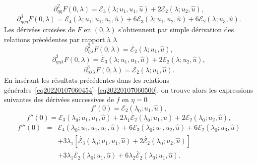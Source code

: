 \documentclass{article}
\newcommand{\nocomma}{}
\newcommand{\nosymbol}{}
\begin{document}
\begin{equation}
  \partial_{\eta \nocomma \eta}^2 F (0, \lambda) =\mathcal{E}_3 (\lambda ;
  u_1, u_1, \hat{u}) + 2\mathcal{E}_2 (\lambda ; u_2, \hat{u}),
\end{equation}
\begin{equation}
  \partial_{\eta \nocomma \eta \nocomma \eta}^3 F (0, \lambda) =\mathcal{E}_4
  (\lambda ; u_1, u_1, u_1, \hat{u}) + 6\mathcal{E}_3 (\lambda ; u_1, u_2,
  \hat{u}) + 6\mathcal{E}_2 (\lambda ; u_3, \hat{u}) .
\end{equation}
Les d{\'e}riv{\'e}es crois{\'e}es de $F$ en $(0, \lambda)$ s'obtiennent par
simple d{\'e}rivation des relations pr{\'e}c{\'e}dentes par rapport {\`a}
$\lambda$
\begin{equation}
  \partial_{\eta \nocomma \lambda}^2 F (0, \lambda) = \dot{\mathcal{E}_2}
  (\lambda ; u_1, \hat{u}),
\end{equation}
\begin{equation}
  \partial_{\eta \nocomma \eta \nocomma \lambda}^3 F (0, \lambda) =
  \dot{\mathcal{E}_3} (\lambda ; u_1, u_1, \hat{u}) + 2 \dot{\mathcal{E}_2}
  (\lambda ; u_2, \hat{u}),
\end{equation}
\begin{equation}
  \partial_{\eta \nocomma \lambda \nocomma \lambda}^3 F (0, \lambda) =
  \ddot{\mathcal{E}_2} (\lambda ; u_1, \hat{u}) .
\end{equation}
En ins{\'e}rant les r{\'e}sultats pr{\'e}c{\'e}dentes dans les relations
g{\'e}n{\'e}rales~\eqref{eq20220107060454}--\eqref{eq20220107060500}, on
trouve alors les expressions suivantes des d{\'e}riv{\'e}es successives de $f$
en $\eta = 0$
\begin{equation}
  f' (0) =\mathcal{E}_2 (\lambda_0 ; u_1, \hat{u}),
\end{equation}
\begin{equation}
  f'' (0) =\mathcal{E}_3 (\lambda_0 ; u_1, u_1, \hat{u}) + 2 \lambda_1
  \dot{\mathcal{E}_2} (\lambda_0 ; u_1, \hat{u}) + 2\mathcal{E}_2 (\lambda_0 ;
  u_2, \hat{u}),
\end{equation}
\begin{eqnarray}
  f''' (0) & = & \mathcal{E}_4 (\lambda_0 ; u_1, u_1, u_1, \hat{u}) +
  6\mathcal{E}_3 (\lambda_0 ; u_1, u_2, \hat{u}) + 6\mathcal{E}_2 (\lambda_0 ;
  u_3, \hat{u}) \nonumber\\
  &  & \nosymbol + 3 \lambda_1  [\dot{\mathcal{E}_3} (\lambda_0 ; u_1, u_1,
  \hat{u}) + 2 \dot{\mathcal{E}_2} (\lambda_0 ; u_2, \hat{u})] \nonumber\\
  &  & \nosymbol + 3 \lambda_1   \ddot{\mathcal{E}_2} (\lambda_0 ; u_1,
  \hat{u}) + 6 \lambda_2  \dot{\mathcal{E}_2} (\lambda_0 ; u_1, \hat{u}) .
\end{eqnarray}
\end{document}

